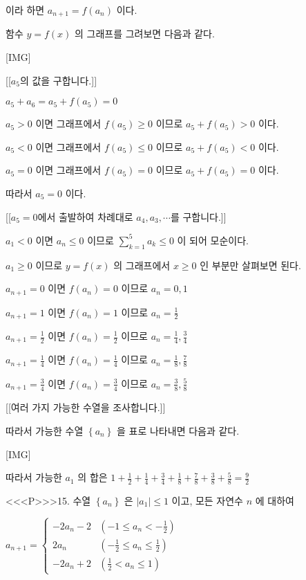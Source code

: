 \documentclass{oblivoir}
\begin{document}
이라 하면 $a_{n+1}=f\left(a_{n}\right)$ 이다.

함수 $y=f(x)$ 의 그래프를 그려보면 다음과 같다.

[IMG]

[[$a_{5}$의 값을 구합니다.]]

$a_{5}+a_{6}=a_{5}+f\left(a_{5}\right)=0$

$a_{5}>0 $ 이면 그래프에서 $ f\left(a_{5}\right) \geq 0 $ 이므로 $a_{5}+f\left(a_{5}\right)>0 $ 이다.

$a_{5}<0 $ 이면 그래프에서 $f\left(a_{5}\right) \leq 0 $ 이므로 $a_{5}+f\left(a_{5}\right)<0 $ 이다.

$a_{5}=0 $ 이면 그래프에서 $f\left(a_{5}\right)=0 $ 이므로 $a_{5}+f\left(a_{5}\right)=0 $ 이다.

따라서 $a_{5}=0$ 이다.

[[$a_{5}=0$에서 출발하여 차례대로 $a_{4},a_{3},\cdots$를 구합니다.]]

$a_{1}<0$ 이면 $a_{n} \leq 0$ 이므로 $\sum_{k=1}^{5} a_{k} \leq 0$ 이 되어 모순이다.

$a_{1} \geq 0$ 이므로 $y=f(x)$ 의 그래프에서 $x \geq 0$ 인 부분만 살펴보면 된다.

$a_{n+1}=0$ 이면 $f\left(a_{n}\right)=0$ 이므로 $a_{n}=0,1$

$a_{n+1}=1$ 이면 $f\left(a_{n}\right)=1$ 이므로 $a_{n}=\frac{1}{2}$

$a_{n+1}=\frac{1}{2}$ 이면 $f\left(a_{n}\right)=\frac{1}{2}$ 이므로 $a_{n}=\frac{1}{4}, \frac{3}{4}$

$a_{n+1}=\frac{1}{4}$ 이면 $f\left(a_{n}\right)=\frac{1}{4} $ 이므로 $a_{n}=\frac{1}{8}, \frac{7}{8}$

$a_{n+1}=\frac{3}{4}$ 이면 $f\left(a_{n}\right)=\frac{3}{4} $ 이므로 $a_{n}=\frac{3}{8}, \frac{5}{8}$

[[여러 가지 가능한 수열을 조사합니다.]]

따라서 가능한 수열 $\left\{a_{n}\right\}$ 을 표로 나타내면 다음과 같다.

[IMG]

따라서 가능한 $a_{1}$ 의 합은 $1+\frac{1}{2}+\frac{1}{4}+\frac{3}{4}+\frac{1}{8}+\frac{7}{8}+\frac{3}{8}+\frac{5}{8}=\frac{9}{2}$


<<<P>>>15. 수열 $\left\{a_{n}\right\}$ 은 $\left|a_{1}\right| \leq 1$ 이고, 모든 자연수 $n$ 에 대하여

$a_{n+1}=\left\{\begin{array}{cl}
-2 a_{n}-2 & \left(-1 \leq a_{n}<-\frac{1}{2}\right)\\
2 a_{n} & \left(-\frac{1}{2} \leq a_{n} \leq \frac{1}{2}\right)\\
-2 a_{n}+2 & \left(\frac{1}{2}<a_{n} \leq 1\right)
\end{array}\right.$
\end{document}
